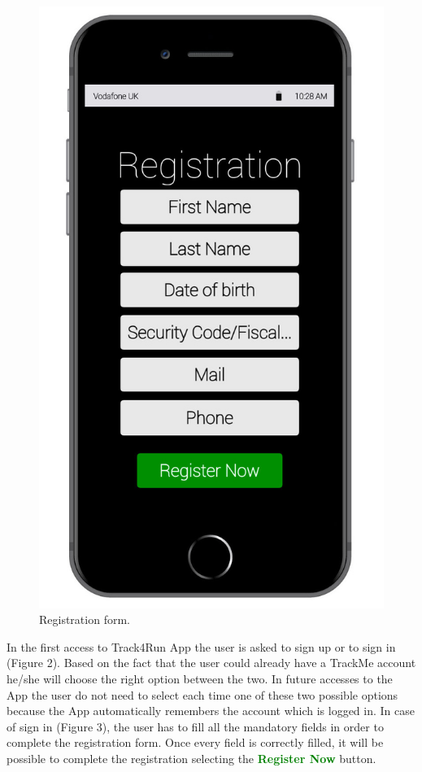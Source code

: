 \begin{enumerate}
\begin{figure}[H]
\begin{center}
\begin{minipage}[c]{.40\textwidth}
          \includegraphics[height=14 cm]{Images/Mockups/Track4RunMockup4.jpg}
	\caption{Registration form.}
        \end{minipage}
      \end{center}
\end{figure}
In the first access to Track4Run App the user is asked to sign up or to sign in 			(Figure 2). Based on the fact that the user could already have a TrackMe account he/she will choose the right option between the two. In future accesses to the App the user do not need to select each time one of these two possible options because the App automatically remembers the account which is logged in. In case of sign in (Figure 3), the user has to fill all the mandatory fields in order to complete the registration form. Once every field is correctly filled, it will be possible to complete the registration selecting the {\textcolor{Green}{\textbf{Register Now}}} button. 
\clearpage
\begin{figure}[H]
\begin{center}
        \begin{minipage}[c]{.40\textwidth}
        \centering

\end{minipage}
\end{center}
\end{figure}
\end{enumerate}
